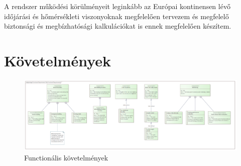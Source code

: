 A rendszer működési körülményeit leginkább az Európai kontinensen lévő időjárási és hőmérsékleti viszonyoknak megfelelően tervezem és megfelelő biztonsági és megbízhatósági kalkulációkat is ennek megfelelően készítem.

\section{Követelmények} \label{requirements}
\begin{figure}
    \centering
    \includegraphics[width=150mm, keepaspectratio]{figures/Functional Requirements.png}
    \caption{Functionális követelmények}
    \label{fig:FunReq}
\end{figure}